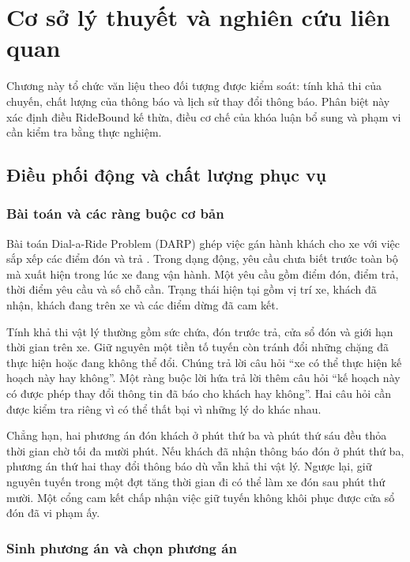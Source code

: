 ﻿\chapter{Cơ sở lý thuyết và nghiên cứu liên quan}

Chương này tổ chức văn liệu theo đối tượng được kiểm soát: tính khả thi của chuyến,
chất lượng của thông báo và lịch sử thay đổi thông báo. Phân biệt này xác định điều
RideBound kế thừa, điều cơ chế của khóa luận bổ sung và phạm vi cần kiểm tra bằng thực nghiệm.

\section{Điều phối động và chất lượng phục vụ}

\subsection{Bài toán và các ràng buộc cơ bản}

Bài toán Dial-a-Ride Problem (DARP) ghép việc gán hành khách cho xe với việc sắp xếp
các điểm đón và trả \cite{cordeau2007}. Trong dạng động, yêu cầu chưa biết trước toàn bộ
mà xuất hiện trong lúc xe đang vận hành. Một yêu cầu gồm điểm đón, điểm trả, thời điểm
yêu cầu và số chỗ cần. Trạng thái hiện tại gồm vị trí xe, khách đã nhận, khách đang trên
xe và các điểm dừng đã cam kết.

Tính khả thi vật lý thường gồm sức chứa, đón trước trả, cửa sổ đón và giới hạn thời gian
trên xe. Giữ nguyên một tiền tố tuyến còn tránh đổi những chặng đã thực hiện hoặc đang
không thể đổi. Chúng trả lời câu hỏi ``xe có thể thực hiện kế hoạch này hay không''.
Một ràng buộc lời hứa trả lời thêm câu hỏi ``kế hoạch này có được phép thay đổi thông tin
đã báo cho khách hay không''. Hai câu hỏi cần được kiểm tra riêng vì có thể thất bại vì
những lý do khác nhau.

Chẳng hạn, hai phương án đón khách ở phút thứ ba và phút thứ sáu đều thỏa thời gian chờ
tối đa mười phút. Nếu khách đã nhận thông báo đón ở phút thứ ba, phương án thứ hai thay
đổi thông báo dù vẫn khả thi vật lý. Ngược lại, giữ nguyên tuyến trong một đợt tăng thời
gian đi có thể làm xe đón sau phút thứ mười. Một cổng cam kết chấp nhận việc giữ tuyến
không khôi phục được cửa sổ đón đã vi phạm ấy.

\subsection{Sinh phương án và chọn phương án}

